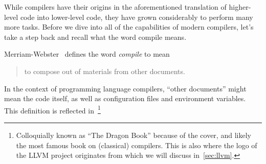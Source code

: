 While compilers have their origins in the aforementioned translation of higher-level code into lower-level code, they have grown considerably to perform many more tasks.
Before we dive into all of the capabilities of modern compilers, let's take a step back and recall what the word compile means.

Merriam-Webster~\cite{compiledef} defines the word \emph{compile} to mean
\begin{quote}
    to compose out of materials from other documents.
\end{quote}
In the context of programming language compilers,  ``other documents'' might mean the code itself, as well as configuration files and environment variables.
This definition is reflected in~\footnote{Colloquially known as ``The Dragon Book'' because of the cover, and likely the most famous book on (classical) compilers. This is also where the logo of the LLVM project originates from which we will discuss in~\cref{sec:llvm}.}
